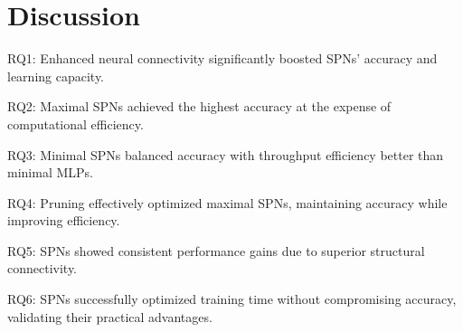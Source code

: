 \section{Discussion}

RQ1: Enhanced neural connectivity significantly boosted SPNs’ accuracy and learning capacity.

RQ2: Maximal SPNs achieved the highest accuracy at the expense of computational efficiency.

RQ3: Minimal SPNs balanced accuracy with throughput efficiency better than minimal MLPs.

RQ4: Pruning effectively optimized maximal SPNs, maintaining accuracy while improving efficiency.

RQ5: SPNs showed consistent performance gains due to superior structural connectivity.

RQ6: SPNs successfully optimized training time without compromising accuracy, validating their practical advantages.
